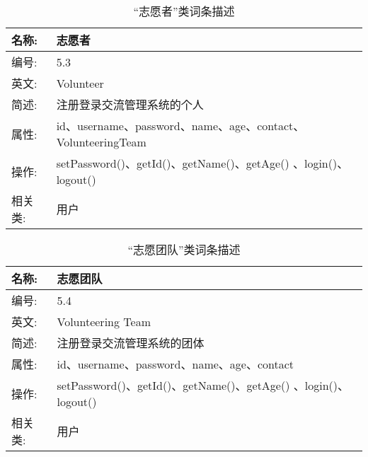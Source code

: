 \begin{table}[H]  
\caption{“志愿者”类词条描述}  
\begin{center}  
    \begin{tabular}{l p{11cm}} 
        \hline
        \quad 名称:  &  志愿者 \\
        \hline
        \quad 编号:  & 5.3 \\
        \hline
        \quad 英文:  &  Volunteer \\
        \hline
        \quad 简述:  & 注册登录交流管理系统的个人 \\
        \hline
        \quad 属性:  & id、username、password、name、age、contact、VolunteeringTeam \\
        \hline 
        \quad 操作:  & setPassword()、getId()、getName()、getAge() 、login()、logout()\\
        \hline
        \quad 相关类:  & 用户 \\
        \hline
    \end{tabular}
\end{center}
\end{table}

\begin{table}[H]  
\caption{“志愿团队”类词条描述}  
\begin{center}  
    \begin{tabular}{l p{11cm}} 
        \hline
        \quad 名称:  &  志愿团队 \\
        \hline
        \quad 编号:  & 5.4 \\
        \hline
        \quad 英文:  &  Volunteering Team \\
        \hline
        \quad 简述:  & 注册登录交流管理系统的团体 \\
        \hline
        \quad 属性:  & id、username、password、name、age、contact \\
        \hline
        \quad 操作:  & setPassword()、getId()、getName()、getAge() 、login()、logout() \\
        \hline
        \quad 相关类:  & 用户 \\
        \hline
    \end{tabular}
\end{center}
\end{table}

